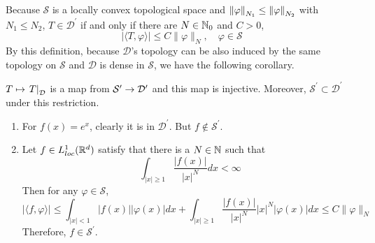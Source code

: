 \begin{enumerate}
	\noindent Because $\mathcal{S}$ is a locally convex topological space and $\left\lVert\varphi\right\lVert_{N_1} \leq \left\lVert\varphi\right\lVert_{N_2}$ with $N_1 \leq N_2$, $T \in \mathcal{D}^\prime$ if and only if there are $N \in \mathbb{N}_0$ and $C> 0$,
	\begin{equation*}
		|\langle T, \varphi\rangle| \leq C\|\varphi\|_N,\quad \varphi \in \mathcal{S}
	\end{equation*}
	By this definition, because $\mathcal{D}$'s topology can be also induced by the same topology on $\mathcal{S}$ and $\mathcal{D}$ is dense in $\mathcal{S}$, we have the following corollary.
	\begin{cor}
		$T \mapsto \left.T\right\lvert_{\mathcal{D}}$ is a map from $\mathcal{S}^\prime \rightarrow \mathcal{D}^\prime$ and this map is injective. Moreover, $\mathcal{S}^\prime \subset \mathcal{D}^\prime$ under this restriction.
	\end{cor}
	\begin{exam}
		\begin{enumerate}
			\item For $f(x) = e^x$, clearly it is in $\mathcal{D}^\prime$. But $f \notin \mathcal{S}^\prime$.
		
			\item Let $f \in L^1_{loc}(\mathbb{R}^d)$ satisfy that there is a $N \in \mathbb{N}$ such that
			\begin{equation*}
				\int_{|x| \geq 1} \frac{|f(x)|}{|x|^N} d x<\infty
			\end{equation*}
			Then for any $\varphi \in \mathcal{S}$,
			\begin{equation*}
				|\langle f, \varphi\rangle| \leq \int_{|x|<1}|f(x)||\varphi(x)| d x+\int_{|x| \geq 1} \frac{|f(x)|}{|x|^N}|x|^N|\varphi(x)| d x \leq C\|\varphi\|_N
			\end{equation*}
			Therefore, $f \in \mathcal{S}^\prime$.


\end{enumerate}
\end{exam}
\end{enumerate}
